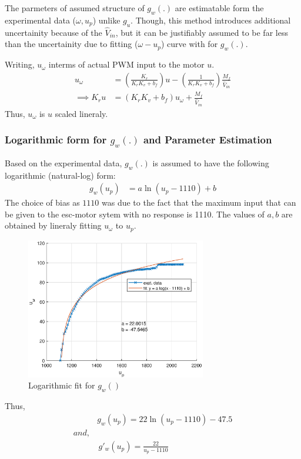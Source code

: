 The parmeters of assumed structure of $g_w(.)$ are estimatable form the experimental data ($\omega, u_p$) unlike $g_u$. Though, this method introduces additional uncertainity because of the $\hat V_{in}$, but it can be justifiably assumed to be far less than the uncertainity due to fitting ($\omega-u_p$) curve with for $g_w(.)$.

Writing, $u_{\omega}$ interms of actual PWM input to the motor $u$.
\begin{align*}
    u_{\omega} &= \left(\frac{K_r}{K_r K_v  + b_f} \right) u - \left(\frac{1}{K_r K_v  + b_f} \right) \frac{M_f}{\hat V_{in}}\\
    \implies K_r u &= (K_r K_v  + b_f) u_\omega + \frac{M_f}{\hat V_{in}}
\end{align*}
Thus, $u_{\omega}$ is $u$ scaled lineraly.

\subsubsection{Logarithmic form for $g_w(.)$ and Parameter Estimation}

Based on the experimental data, $g_w(.)$ is assumed to have the following logarithmic (natural-log) form:
\begin{align*}
    g_w(u_p) &= a \ln(u_p - 1110) + b
\end{align*}
The choice of bias as $1110$ was due to the fact that the maximum input that can be given to the esc-motor sytem with no response is 1110. The values of $a, b$ are obtained by lineraly fitting $u_\omega$ to $u_p$.

\begin{figure}[H]
    \centering
    \includegraphics[width = 0.7\textwidth]{./figs/norm_omega/g_w.eps}
    \caption{Logarithmic fit for $g_w()$}
\end{figure}
Thus,
\begin{align*}
    &\boxed{g_w(u_p) = 22 \ln(u_p - 1110)- 47.5 }\\
    and, &\\
    &\, g'_w(u_p) = \frac{22}{u_p - 1110}
\end{align*}
